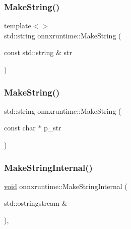 \mbox{\label{namespaceonnxruntime_a6eea155ad1bc64ecc8e4d14c16faa3eb}} 
\subsubsection{\texorpdfstring{Make\+String()}{MakeString()}\hspace{0.1cm}{\footnotesize\ttfamily [2/3]}}
{\footnotesize\ttfamily template$<$$>$ \\
std\+::string onnxruntime\+::\+Make\+String (\begin{DoxyParamCaption}\item[{const std\+::string \&}]{str }\end{DoxyParamCaption})\hspace{0.3cm}{\ttfamily [inline]}}

\mbox{\label{namespaceonnxruntime_aa17be809dcb43bf2bb7f97d8e2015d90}} 
\subsubsection{\texorpdfstring{Make\+String()}{MakeString()}\hspace{0.1cm}{\footnotesize\ttfamily [3/3]}}
{\footnotesize\ttfamily std\+::string onnxruntime\+::\+Make\+String (\begin{DoxyParamCaption}\item[{const char $\ast$}]{p\+\_\+str }\end{DoxyParamCaption})\hspace{0.3cm}{\ttfamily [inline]}}

\mbox{\label{namespaceonnxruntime_a08e4e8fab533465b689f76e9c869d9e5}} 
\subsubsection{\texorpdfstring{Make\+String\+Internal()}{MakeStringInternal()}\hspace{0.1cm}{\footnotesize\ttfamily [1/3]}}
{\footnotesize\ttfamily \mbox{\hyperlink{mlasi_8h_a88f941d423cb2a819b70a1358982b1a6}{void}} onnxruntime\+::\+Make\+String\+Internal (\begin{DoxyParamCaption}\item[{std\+::ostringstream \&}]{ }\end{DoxyParamCaption})\hspace{0.3cm}{\ttfamily [inline]}, {\ttfamily [noexcept]}}

